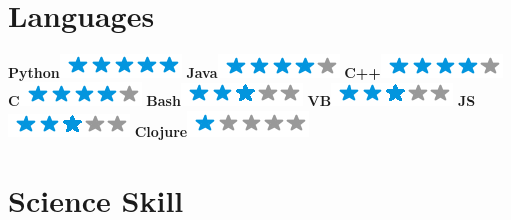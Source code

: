 \begin{aside}
	~
	~
	~
	~
	~
	~
	~
	~
	~
	~
	~
    \section{Languages}
    \textbf{Python}\includegraphics[scale=0.40]{img/5stars.png}
    \textbf{Java}\includegraphics[scale=0.40]{img/4stars.png}
    \textbf{C++}\includegraphics[scale=0.40]{img/4stars.png}
    \textbf{C}\includegraphics[scale=0.40]{img/4stars.png}
    \textbf{Bash}\includegraphics[scale=0.40]{img/3stars.png}
    \textbf{VB}\includegraphics[scale=0.40]{img/3stars.png}
    \textbf{JS}\includegraphics[scale=0.40]{img/3stars.png}
    \textbf{Clojure}\includegraphics[scale=0.40]{img/1stars.png}
    ~
	~
	~
	~
	~
	~
	~
	~
	~
	~
	~
	~
	~
	~
	~
    \section{Science Skill}
    ~
    ~
    ~
\end{aside}
